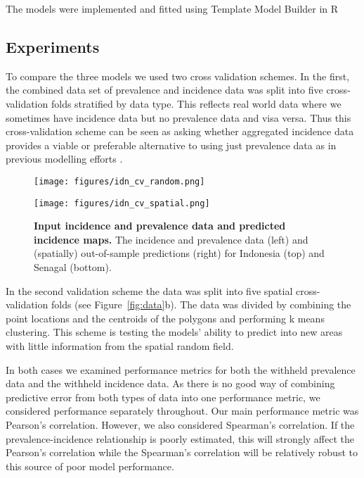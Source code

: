 \documentclass[10pt,letterpaper]{article}
\begin{document}
The models were implemented and fitted using Template Model Builder \cite{TMB} in R \cite{R}

\subsection*{Experiments}

To compare the three models we used two cross validation schemes. 
In the first, the combined data set of prevalence and incidence data was split into five cross-validation folds stratified by data type.
This reflects real world data where we sometimes have incidence data but no prevalence data and visa versa.
Thus this cross-validation scheme can be seen as asking whether aggregated incidence data provides a viable or preferable alternative to using just prevalence data as in previous modelling efforts \cite{bhatt2015effect}.


\begin{figure}[!h]
\centering
\begin{minipage}{0.45\textwidth} \centering 
\texttt{[image: figures/idn\_cv\_random.png]} %
\end{minipage}
\begin{minipage}{0.45\textwidth} \centering 
\texttt{[image: figures/idn\_cv\_spatial.png]} %
\end{minipage}

\caption{{\bf Input incidence and prevalence data and predicted incidence maps. } The incidence and prevalence data (left) and (spatially) out-of-sample predictions (right) for Indonesia (top) and Senagal (bottom).}
\label{fig1}
\end{figure}





In the second validation scheme the data was split into five spatial cross-validation folds (see Figure~\ref{fig:data}b).
The data was divided by combining the point locations and the centroids of the polygons and performing k means clustering.
This scheme is testing the models' ability to predict into new areas with little information from the spatial random field.

In both cases we examined performance metrics for both the withheld prevalence data and the withheld incidence data.
As there is no good way of combining predictive error from both types of data into one performance metric, we considered performance separately throughout.
Our main performance metric was Pearson's correlation.
However, we also considered Spearman's correlation.
If the prevalence-incidence relationship is poorly estimated, this will strongly affect the Pearson's correlation while the Spearman's correlation will be relatively robust to this source of poor model performance.
\end{document}
